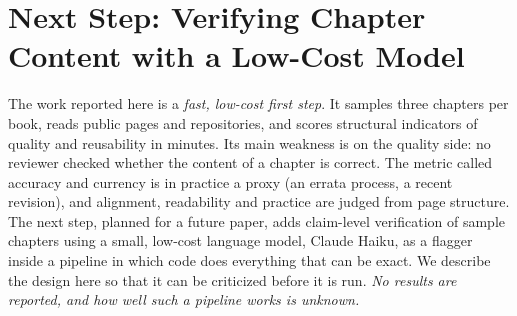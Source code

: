 \section{Next Step: Verifying Chapter Content with a Low-Cost Model}
\label{sec:nextstep}

The work reported here is a \emph{fast, low-cost first step}. It samples three chapters per book, reads public pages and repositories, and scores structural indicators of quality and reusability in minutes. Its main weakness is on the quality side: no reviewer checked whether the content of a chapter is correct. The metric called accuracy and currency is in practice a proxy (an errata process, a recent revision), and alignment, readability and practice are judged from page structure. The next step, planned for a future paper, adds claim-level verification of sample chapters using a small, low-cost language model, Claude Haiku, as a flagger inside a pipeline in which code does everything that can be exact. We describe the design here so that it can be criticized before it is run. \emph{No results are reported, and how well such a pipeline works is unknown.}

